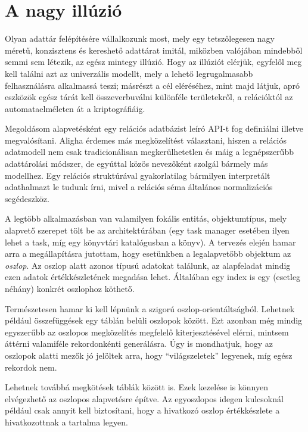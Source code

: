 \documentclass[
    parspace,
    noindent,
    nohyp,
]{elteiktdk}[2023/04/10]
\begin{document}
\section{A nagy illúzió}

Olyan adattár felépítésére vállalkozunk most,
mely egy tetszőlegesen nagy méretű, konzisztens és kereshető adattárat imitál,
miközben valójában mindebből semmi sem létezik,
az egész mintegy illúzió.
Hogy az illúziót elérjük, egyfelől meg kell találni azt az univerzális modellt,
mely a lehető legrugalmasabb felhasználásra alkalmassá teszi;
másrészt a cél eléréséhez, mint majd látjuk, apró eszközök egész tárát kell összeverbuválni
különféle területekről, a relációktól az automataelméleten át a kriptográfiáig.

Megoldásom alapvetésként egy relációs adatbázist leíró API-t fog definiálni illetve megvalósítani.
Aligha érdemes más megközelítést választani,
hiszen a relációs adatmodell nem csak tradicionálisan megkerülhetetlen
és máig a legnépszerűbb adattárolási módszer\cite{Akhtar2023PopularityRO},
de egyúttal közös nevezőként szolgál bármely más modellhez.
Egy relációs struktúrával gyakorlatilag bármilyen interpretált adathalmazt le tudunk írni,
mivel a relációs séma általános normalizációs segédeszköz.

A legtöbb alkalmazásban van valamilyen fokális entitás, objektumtípus,
mely alapvető szerepet tölt be az architektúrában
(egy task manager esetében ilyen lehet a task,
míg egy könyvtári katalógusban a könyv).
A tervezés elején hamar arra a megállapításra jutottam,
hogy esetünkben a legalapvetőbb objektum az \textit{oszlop}.
Az oszlop alatt azonos típusú adatokat találunk,
az alapfeladat mindig ezen adatok értékkészletének megadása lehet.
Általában egy index is egy (esetleg néhány) konkrét oszlophoz köthető.

Természetesen hamar ki kell lépnünk a szigorú oszlop-orientáltságból.
Lehetnek például összefüggések egy táblán belüli oszlopok között.
Ezt azonban még mindig egyszerűbb az oszlopos megközelítés megfelelő kiterjesztésével elérni,
mintsem áttérni valamiféle rekordonkénti generálásra.
Úgy is mondhatjuk, hogy az oszlopok alatti mezők jó jelöltek arra, hogy ``világszeletek'' legyenek,
míg egész rekordok nem.

Lehetnek továbbá megkötések táblák között is.
Ezek kezelése is könnyen elvégezhető az oszlopos alapvetésre építve.
Az egyoszlopos idegen kulcsoknál például csak annyit kell biztosítani,
hogy a hivatkozó oszlop értékkészlete a hivatkozottnak a tartalma legyen.
\end{document}
